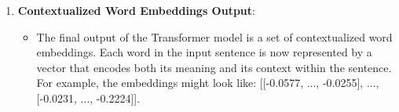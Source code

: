 \begin{enumerate}
    \item \textbf{Contextualized Word Embeddings Output}:
    \begin{itemize}
        \item The final output of the Transformer model is a set of contextualized word embeddings. Each word in the input sentence is now represented by a vector that encodes both its meaning and its context within the sentence. For example, the embeddings might look like:
        [[-0.0577, ..., -0.0255],
         ...,
         [-0.0231, ..., -0.2224]].
    \end{itemize}
\end{enumerate}

